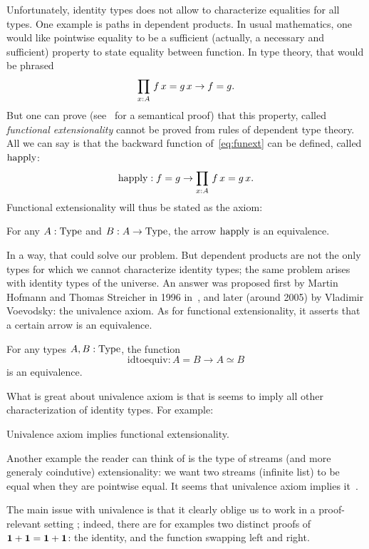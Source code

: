 Unfortunately, identity types does not allow to characterize
equalities for all types. One example is paths in dependent
products. In usual mathematics, one would like pointwise equality to
be a sufficient (actually, a necessary and sufficient) property to
state equality between function. In type theory, that would be phrased
\begin{equation}\label{eq:funext}
 \prod_{x:A}\, f\, x = g\, x \to f = g.  
\end{equation}
But one can prove (see~\cite{streicher93} for a semantical proof) that
this property, called {\em functional extensionality} cannot be proved
from rules of dependent type theory.
All we can say is that the backward function of~\ref{eq:funext} can be
defined, called $\mathrm{happly}$:
\[ \mathrm{happly}: f = g \to \prod_{x:A}\, f\, x = g\, x. \]
Functional extensionality will thus be stated as the axiom:
\begin{ax}
  For any $A:\operatorname{Type}$ and $B:A\to\operatorname{Type}$, the arrow $\mathrm{happly}$ is an equivalence.
\end{ax}
In a way, that could solve our problem. But dependent products are not
the only types for which we cannot characterize identity types; the
same problem arises with identity types of the universe. An answer was
proposed first by Martin Hofmann and Thomas Streicher in 1996
in~\cite{Hofmann96thegroupoid}, and later (around 2005) by Vladimir
Voevodsky: the univalence axiom. As for functional extensionality, it
asserts that a certain arrow is an equivalence.

\begin{ax}
  For any types $A,B:\operatorname{Type}$, the function
  \[ \mathrm{idtoequiv} : A = B \to A\simeq B \]
  is an equivalence.
\end{ax}

What is great about univalence axiom is that is seems to imply all
other characterization of identity types. For example:
\begin{lem}
  Univalence axiom implies functional extensionality.
\end{lem}
Another example the reader can think of is the type of streams (and more generaly coindutive) extensionality:
we want two streams (infinite list) to be equal when they are
pointwise equal. It seems that univalence axiom implies it~\cite{licata14uafs}.

The main issue with univalence is that it clearly oblige us to work in
a proof-relevant setting ; indeed, there are for examples two distinct
proofs of $\mathbf{1}+\mathbf{1} = \mathbf{1}+\mathbf{1}$: the identity, and the function
swapping left and right.

